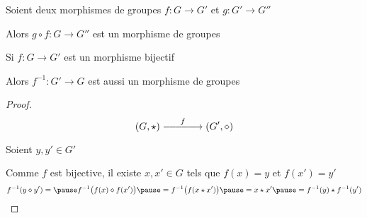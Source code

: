 \begin{frame}

\begin{proposition}
Soient deux morphismes de groupes $f : G \longrightarrow G'$ et $g : G'  \longrightarrow G''$

Alors $g \circ f : G \longrightarrow G''$ est un morphisme de groupes
\end{proposition}

\pause

\begin{proposition}
Si $f : G \longrightarrow G'$ est un morphisme bijectif 

Alors $f^{-1} : G' \longrightarrow G$ est aussi un morphisme de groupes
\end{proposition}

\pause

\begin{proof}
$$(G,\tikz[remember picture]\coordinate(invtop);\star) 
\overset{f}{\relbar\joinrel\relbar\joinrel\relbar\joinrel\relbar\joinrel\longrightarrow} 
(G',\tikz[remember picture]\coordinate(invbot);\diamond)$$

\pause



\pause

Soient $y,y'\in G'$

Comme $f$ est bijective, il existe $x,x'\in G$ tels que $f(x)=y$ et $f(x')=y'$
 $$f^{-1}(y\diamond y') = 
\pause
 f^{-1}\big(f(x)\diamond f(x') \big) 
\pause
= f^{-1}\big(f(x \star x') \big) 
\pause
= x\star x' 
\pause
= f^{-1}(y)\star f^{-1}(y')$$
\end{proof}  
\end{frame}


